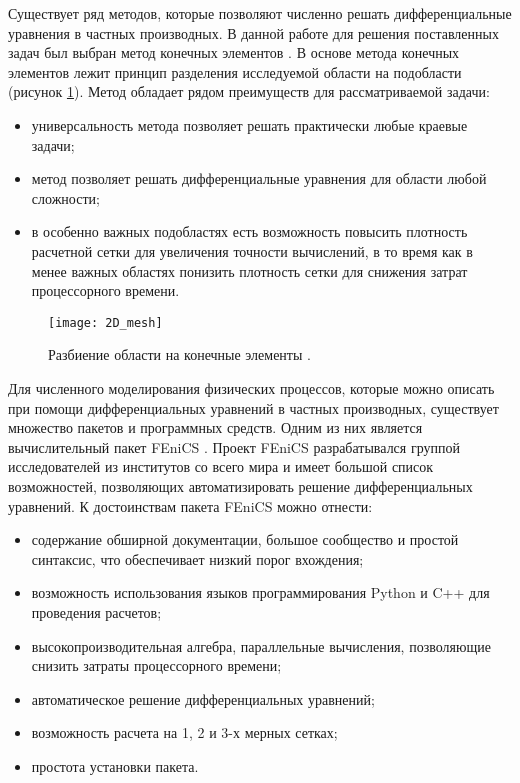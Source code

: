 Существует ряд методов, которые позволяют численно решать дифференциальные уравнения в частных производных. В данной 
работе для решения поставленных задач был выбран метод конечных элементов \cite{mke}. В основе метода конечных 
элементов лежит принцип разделения исследуемой области на подобласти (рисунок \ref{fig_mesh}). Метод обладает рядом 
преимуществ для рассматриваемой задачи:

\begin{itemize}
	\item универсальность метода позволяет решать практически любые краевые задачи;
	\item метод позволяет решать дифференциальные уравнения для области любой сложности;
	\item в особенно важных подобластях есть возможность повысить плотность расчетной сетки для увеличения точности 
		вычислений, в то время как в менее важных областях понизить плотность сетки для снижения затрат процессорного 
		времени. 
\end{itemize}

\begin{figure}[ht]
\centering
	\texttt{[image: 2D\_mesh]}
	\captionsetup{justification=centering}
    \caption{Разбиение области на конечные элементы \cite{wiki_mke_fig}.}
    \label{fig_mesh}
\end{figure}


Для численного моделирования физических процессов, которые можно описать при помощи дифференциальных уравнений в 
частных производных, существует множество пакетов и программных средств. Одним из них является вычислительный пакет 
FEniCS \cite{fenics_tut1}. Проект FEniCS разрабатывался группой исследователей из институтов со всего мира и имеет 
большой список возможностей, позволяющих автоматизировать решение дифференциальных уравнений. К достоинствам пакета 
FEniCS можно отнести:

\begin{itemize}
	\item содержание обширной документации, большое сообщество и простой синтаксис, что обеспечивает низкий порог 
		вхождения;
	\item возможность использования языков программирования Python и C++ для проведения расчетов;
	\item высокопроизводительная алгебра, параллельные вычисления, позволяющие снизить затраты процессорного времени; 
	\item автоматическое решение дифференциальных уравнений;
	\item возможность расчета на 1, 2 и 3-х мерных сетках;
	\item простота установки пакета.
\end{itemize}

